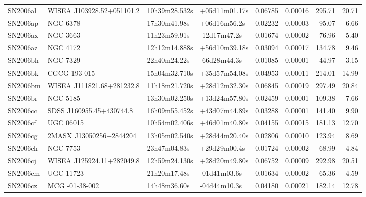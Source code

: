 \begin{longtable}{llllrrrr}
SN2006al         &       WISEA J103928.52+051101.2 &   10h39m28.532s &   +05d11m01.17s &  0.06785 &  0.00016 &   295.71 &       20.71 \\
SN2006ap         &                        NGC 6378 &    17h30m41.98s &    +06d16m56.2s &  0.02232 &  0.00003 &    95.07 &        6.66 \\
SN2006ax         &                        NGC 3663 &    11h23m59.91s &    -12d17m47.2s &  0.01674 &  0.00002 &    76.96 &        5.40 \\
SN2006az         &                        NGC 4172 &   12h12m14.888s &   +56d10m39.18s &  0.03094 &  0.00017 &   134.78 &        9.46 \\
SN2006bh         &                        NGC 7329 &    22h40m24.22s &    -66d28m44.3s &  0.01085 &  0.00001 &    44.97 &        3.15 \\
SN2006bk         &                    CGCG 193-015 &   15h04m32.710s &   +35d57m54.08s &  0.04953 &  0.00011 &   214.01 &       14.99 \\
SN2006bm         &       WISEA J111821.68+281232.8 &   11h18m21.720s &   +28d12m32.30s &  0.06845 &  0.00019 &   297.49 &       20.84 \\
SN2006br         &                        NGC 5185 &   13h30m02.250s &   +13d24m57.80s &  0.02459 &  0.00001 &   109.38 &        7.66 \\
SN2006cc         &        SDSS J160955.45+430744.8 &   16h09m55.452s &   +43d07m44.89s &  0.03288 &  0.00001 &   141.40 &        9.90 \\
SN2006cf         &                       UGC 06015 &   10h54m02.406s &   +46d01m40.80s &  0.04155 &  0.00015 &   181.13 &       12.70 \\
SN2006cg         &         2MASX J13050256+2844204 &   13h05m02.540s &   +28d44m20.40s &  0.02806 &  0.00010 &   123.94 &        8.69 \\
SN2006ch         &                        NGC 7753 &    23h47m04.83s &    +29d29m00.4s &  0.01724 &  0.00002 &    68.99 &        4.84 \\
SN2006cj         &       WISEA J125924.11+282049.8 &   12h59m24.130s &   +28d20m49.80s &  0.06752 &  0.00009 &   292.98 &       20.51 \\
SN2006cm         &                       UGC 11723 &    21h20m17.48s &    -01d41m03.6s &  0.01634 &  0.00002 &    65.36 &        4.59 \\
SN2006cz         &                  MCG -01-38-002 &    14h48m36.60s &    -04d44m10.3s &  0.04180 &  0.00021 &   182.14 &       12.78 \\

\end{longtable}
